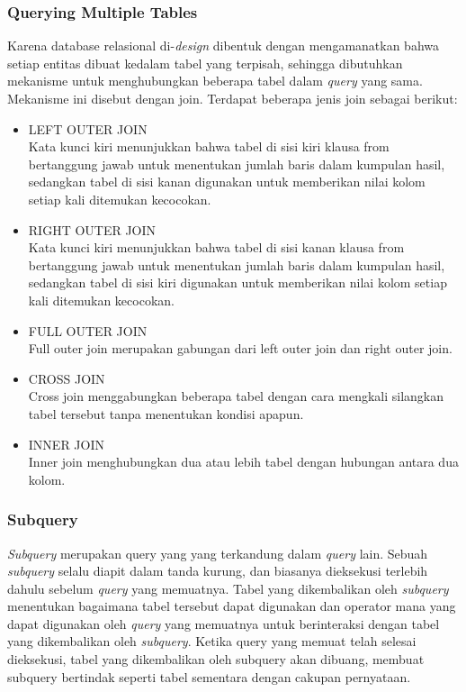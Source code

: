 \subsubsection{Querying Multiple Tables}
Karena database relasional di-\textit{design} dibentuk dengan mengamanatkan bahwa setiap entitas dibuat kedalam tabel yang terpisah, sehingga dibutuhkan mekanisme untuk menghubungkan beberapa tabel dalam \textit{query} yang sama. Mekanisme ini disebut dengan join. Terdapat beberapa jenis join sebagai berikut:
\begin{itemize}
	\item LEFT OUTER JOIN \\
	Kata kunci kiri menunjukkan bahwa tabel di sisi kiri klausa from bertanggung jawab untuk menentukan jumlah baris dalam kumpulan hasil, sedangkan tabel di sisi kanan digunakan untuk memberikan nilai kolom setiap kali ditemukan kecocokan.
	\item RIGHT OUTER JOIN \\
	Kata kunci kiri menunjukkan bahwa tabel di sisi kanan klausa from bertanggung jawab untuk menentukan jumlah baris dalam kumpulan hasil, sedangkan tabel di sisi kiri digunakan untuk memberikan nilai kolom setiap kali ditemukan kecocokan.
	\item FULL OUTER JOIN \\
	Full outer join merupakan gabungan dari left outer join dan right outer join.
	\item CROSS JOIN \\
	Cross join menggabungkan beberapa tabel dengan cara mengkali silangkan tabel tersebut tanpa menentukan kondisi apapun.
	\item INNER JOIN \\
	Inner join menghubungkan dua atau lebih tabel dengan hubungan antara dua kolom.
\end{itemize}

\subsubsection{Subquery}
\textit{Subquery} merupakan query yang yang terkandung dalam \textit{query} lain. Sebuah \textit{subquery} selalu diapit dalam tanda kurung, dan biasanya dieksekusi terlebih dahulu sebelum \textit{query} yang memuatnya. Tabel yang dikembalikan oleh \textit{subquery} menentukan bagaimana tabel tersebut dapat digunakan dan operator mana yang dapat digunakan oleh \textit{query} yang memuatnya untuk berinteraksi dengan tabel yang dikembalikan oleh \textit{subquery}. Ketika query yang memuat telah selesai dieksekusi, tabel yang dikembalikan oleh subquery akan dibuang, membuat subquery bertindak seperti tabel sementara dengan cakupan pernyataan. 


